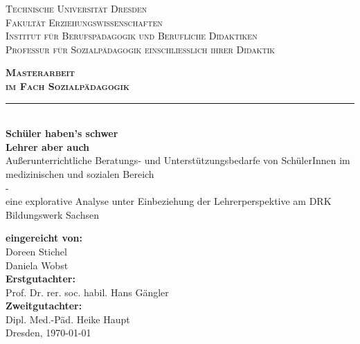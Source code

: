 \begin{titlepage}
\begin{center}
\normalsize
\scshape
Technische Universität Dresden\\
\normalsize
\upshape
Fakultät Erziehungswissenschaften\\
Institut für Berufspädagogik und Berufliche Didaktiken\\
Professur für Sozialpädagogik einschließlich ihrer Didaktik\\[2,0cm]
\end{center}

\begin{center}
\Huge
\scshape
\bfseries
Masterarbeit\\[0,5cm]
\normalsize
\mdseries
im Fach Sozialpädagogik\\
\noindent\rule{\textwidth}{1pt}\\[1cm]
\normalsize
\mdseries
\textbf{Schüler haben's schwer}\\
\textbf{Lehrer aber auch}\\[0,5cm]
\normalsize
\mdseries
Außerunterrichtliche Beratungs- und Unterstützungsbedarfe von SchülerInnen im medizinischen und sozialen Bereich\\
-\\
eine explorative Analyse unter Einbeziehung der Lehrerperspektive am DRK Bildungswerk Sachsen\\[2,0cm]
\end{center}

\begin{center}
\textbf{eingereicht von:}\\
Doreen Stichel\\
Daniela Wobst\\[1,0cm]

\textbf{Erstgutachter:}\\
Prof. Dr. rer. soc. habil. Hans Gängler\\[1,0cm]
\textbf{Zweitgutachter:} \\
Dipl. Med.-Päd. Heike Haupt\\[1,0cm]

Dresden, \today
\end{center}

\end{titlepage}